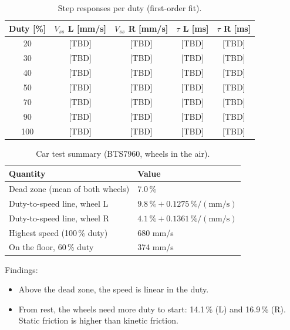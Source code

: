 \documentclass[11pt,a4paper]{article}
\begin{document}
\begin{table}[H]
  \centering
  \caption{Step responses per duty (first-order fit).}
  \begin{tabular}{@{}ccccc@{}}
    \toprule
    \textbf{Duty [\%]} & \(V_{ss}\) \textbf{L [mm/s]} & \(V_{ss}\) \textbf{R [mm/s]}
      & \(\tau\) \textbf{L [ms]} & \(\tau\) \textbf{R [ms]} \\ \midrule
    20  & [TBD] & [TBD] & [TBD] & [TBD] \\
    30  & [TBD] & [TBD] & [TBD] & [TBD] \\
    40  & [TBD] & [TBD] & [TBD] & [TBD] \\
    50  & [TBD] & [TBD] & [TBD] & [TBD] \\
    70  & [TBD] & [TBD] & [TBD] & [TBD] \\
    90  & [TBD] & [TBD] & [TBD] & [TBD] \\
    100 & [TBD] & [TBD] & [TBD] & [TBD] \\ \bottomrule
  \end{tabular}
\end{table}

\begin{table}[H]
  \centering
  \caption{Car test summary (BTS7960, wheels in the air).}
  \begin{tabular}{@{}ll@{}}
    \toprule
    \textbf{Quantity} & \textbf{Value} \\ \midrule
    Dead zone (mean of both wheels)      & 7.0\,\% \\
    Duty-to-speed line, wheel L          & \(9.8\,\% + 0.1275\,\%/(\mathrm{mm/s})\) \\
    Duty-to-speed line, wheel R          & \(4.1\,\% + 0.1361\,\%/(\mathrm{mm/s})\) \\
    Highest speed (100\,\% duty)         & 680 mm/s \\
    On the floor, 60\,\% duty            & 374 mm/s \\ \bottomrule
  \end{tabular}
\end{table}

Findings:
\begin{itemize}
  \item Above the dead zone, the speed is linear in the duty.
  \item From rest, the wheels need more duty to start: 14.1\,\% (L) and 16.9\,\% (R).
        Static friction is higher than kinetic friction.
\end{itemize}
\end{document}
